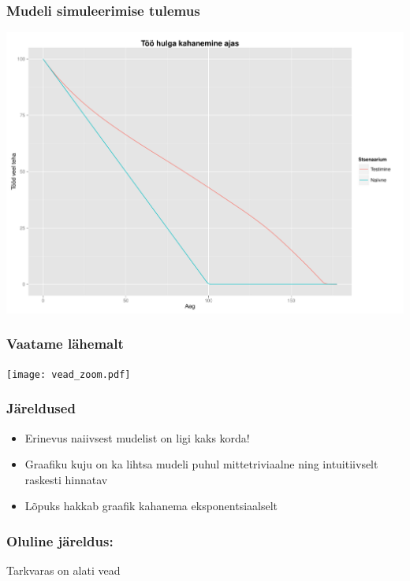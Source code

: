 \begin{frame}[fragile]
  \frametitle{Mudeli simuleerimise tulemus}
  	\begin{center}
			\includegraphics[width=.9\textwidth]{vead.pdf}
	\end{center}
\end{frame}

\begin{frame}[fragile]
  \frametitle{Vaatame lähemalt}
  	\begin{center}
			\texttt{[image: vead\_zoom.pdf]}
	\end{center}
\end{frame}


\begin{frame}[fragile]
  \frametitle{Järeldused}
	\begin{itemize}
		\item Erinevus naiivsest mudelist on ligi kaks korda!
		\item Graafiku kuju on ka lihtsa mudeli puhul mittetriviaalne ning intuitiivselt raskesti hinnatav
		\item Lõpuks hakkab graafik kahanema eksponentsiaalselt
	\end{itemize}
	
\end{frame}

\begin{frame}[fragile]
	\frametitle{Oluline järeldus:}
	\vfill
	\begin{center}
		Tarkvaras on alati vead  
	\end{center}
	\vfill
\end{frame}

